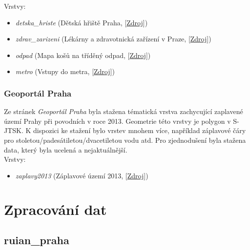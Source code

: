 \documentclass[a4paper, 12pt]{article}
\begin{document}
Vrstvy:  
\begin{itemize}
\item \textsl{detska\_hriste} (Dětská hřiště Praha, [\href{https://data.gov.cz/datov%C3%A1-sada?iri=https%3A%2F%2Fdata.gov.cz%2Fzdroj%2Fdatov%C3%A1-sada%2Fhttp---opendata.praha.eu-api-3-action-package_show-id-detska-hriste-praha}{Zdroj}])
\item \textsl{zdrav\_zarizeni} (Lékárny a zdravotnická zařízení v Praze, [\href{https://data.gov.cz/datov%C3%A1-sada?iri=https%3A%2F%2Fdata.gov.cz%2Fzdroj%2Fdatov%C3%A1-sada%2Fhttp---opendata.praha.eu-api-3-action-package_show-id-lekarny-a-zdravotnicka-zarizeni-v-praze}{Zdroj}])
\item \textsl{odpad} (Mapa košů na tříděný odpad, [\href{https://data.gov.cz/datov%C3%A1-sada?iri=https%3A%2F%2Fdata.gov.cz%2Fzdroj%2Fdatov%C3%A1-sada%2Fhttp---opendata.praha.eu-api-3-action-package_show-id-mapa-trideny-odpad}{Zdroj}])
\item \textsl{metro} (Vstupy do metra, [\href{https://data.gov.cz/datov%C3%A1-sada?iri=https%3A%2F%2Fdata.gov.cz%2Fzdroj%2Fdatov%C3%A1-sada%2Fhttp---opendata.praha.eu-api-3-action-package_show-id-ipr-prazska_integrovana_doprava_-_vstupy_do_metra}{Zdroj}])
\end{itemize}

\subsubsection{Geoportál Praha}
Ze stránek \textit{Geoportál Praha} byla stažena tématická vrstva zachycující zaplavené území Prahy při povodních v roce 2013. Geometrie této vrstvy je polygon v S-JTSK. K dispozici ke stažení bylo vrstev mnohem více, například záplavové čáry pro stoletou/padesátiletou/dvacetiletou vodu atd. Pro zjednodušení byla stažena data, který byla ucelená a nejaktuálnější.\\

Vrstvy:
\begin{itemize}
\item \textsl{zaplavy2013} (Záplavové území 2013, [\href{http://www.geoportalpraha.cz/cs/opendata/C121457E-5450-42D0-9009-204D8D899A06#.XE9PwWlCfIV}{Zdroj}])
\end{itemize}

\section{Zpracování dat}
\subsection{ruian\_praha}
\end{document}
